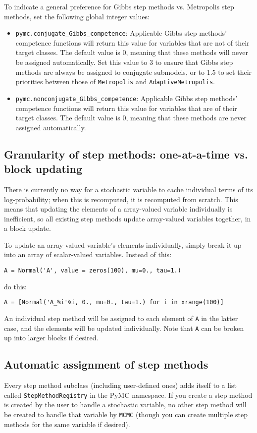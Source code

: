 To indicate a general preference for Gibbs step methods vs. Metropolis step methods, set the following global integer values:
\begin{itemize}
    \item \texttt{pymc.conjugate_Gibbs_competence}: Applicable Gibbs step methods' competence functions will return this value for variables that are not of their target classes. The default value is 0, meaning that these methods will never be assigned automatically. Set this value to 3 to ensure that Gibbs step methods are always be assigned to conjugate submodels, or to 1.5 to set their priorities between those of \texttt{Metropolis} and \texttt{AdaptiveMetropolis}.
    \item \texttt{pymc.nonconjugate_Gibbs_competence}: Applicable Gibbs step methods' competence functions will return this value for variables that are of their target classes. The default value is 0, meaning that these methods are never assigned automatically.
\end{itemize}


\subsection*{Granularity of step methods: one-at-a-time vs. block updating} 
There is currently no way for a stochastic variable to cache individual terms of its log-probability; when this is recomputed, it is recomputed from scratch. This means that updating the elements of a array-valued variable individually is inefficient, so all existing step methods update array-valued variables together, in a block update.

To update an array-valued variable's elements individually, simply break it up into an array of scalar-valued variables. Instead of this:
\begin{verbatim}
A = Normal('A', value = zeros(100), mu=0., tau=1.)    
\end{verbatim}
do this:
\begin{verbatim}
A = [Normal('A_%i'%i, 0., mu=0., tau=1.) for i in xrange(100)]
\end{verbatim}
An individual step method will be assigned to each element of \texttt{A} in the latter case, and the elements will be updated individually. Note that \texttt{A} can be broken up into larger blocks if desired.

\subsection*{Automatic assignment of step methods} 
Every step method subclass (including user-defined ones) adds itself to a list called \texttt{StepMethodRegistry} in the PyMC namespace. If you create a step method is created by the user to handle a stochastic variable, no other step method will be created to handle that variable by \texttt{MCMC} (though you can create multiple step methods for the same variable if desired). 

